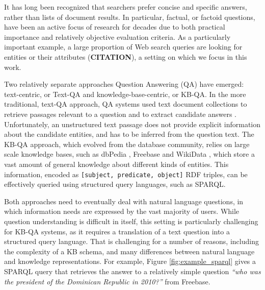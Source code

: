 It has long been recognized that searchers prefer concise and specific answers, rather than lists of document results. In particular, factual, or factoid questions, have been an active focus of research for decades due to both practical importance and relatively objective evaluation criteria. As a particularly important example, a large proportion of Web search queries are looking for entities or their attributes (\textbf{CITATION}), a setting on which we focus in this work. 

Two relatively separate approaches Question Answering (QA) have emerged: text-centric, or Text-QA and knowledge-base-centric, or KB-QA. In the more traditional, text-QA approach, QA systems used text document collections to retrieve passages relevant to a question and to extract candidate answers \cite{Vrandecic:2014:WFC:2661061.2629489}. Unfortunately, an unstructured text passage does not provide explicit information about the candidate entities, and has to be inferred from the question text. The KB-QA approach, which evolved from the database community, relies on large scale knowledge bases, such as dbPedia \cite{auer2007dbpedia}, Freebase \cite{Bollacker:2008:FCC:1376616.1376746} and WikiData \cite{Vrandecic:2014:WFC:2661061.2629489}, which store a vast amount of general knowledge about different kinds of entities.
This information, encoded as \texttt{[subject, predicate, object]} RDF triples, can be effectively queried using structured query languages, such as SPARQL.

Both approaches need to eventually deal with natural language questions, in which information needs are expressed by the vast majority of users. While question understanding is difficult in itself, this setting is particularly challenging for KB-QA systems, as it requires a translation of a text question into a structured query language. That is challenging for a number of reasons, including the complexity of a KB schema, and many differences between natural language and knowledge representations.  For example, Figure \ref{fig:example_sparql} gives a SPARQL query that retrieves the answer to a relatively simple question \textit{``who was the president of the Dominican Republic in 2010?''} from Freebase.


